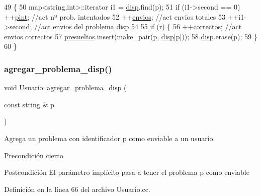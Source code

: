 \begin{DoxyCode}
49                                                  \{
50         map<string,int>::iterator i1 = \mbox{\hyperlink{class_usuario_a4402178ca5b057733c675e3849718e96}{disp}}.find(p);
51         \textcolor{keywordflow}{if} (i1->second == 0) ++\mbox{\hyperlink{class_usuario_adff16a149798e94b0747e7dc1bd85107}{pint}}; \textcolor{comment}{//act nº prob. intentados}
52         ++\mbox{\hyperlink{class_usuario_a485a741c0646e6414bd6cf669a77fc9c}{envios}}; \textcolor{comment}{//act envios totales}
53         ++i1->second; \textcolor{comment}{//act envios del problema disp}
54 
55         \textcolor{keywordflow}{if} (r) \{
56           ++\mbox{\hyperlink{class_usuario_a6d7fd52e0625b61d324922bf4783435e}{correctos}}; \textcolor{comment}{//act envios correctos}
57           \mbox{\hyperlink{class_usuario_ae614e565ce48a314a1e2b05beee8567b}{presueltos}}.insert(make\_pair(p, \mbox{\hyperlink{class_usuario_a4402178ca5b057733c675e3849718e96}{disp}}[p]));
58           \mbox{\hyperlink{class_usuario_a4402178ca5b057733c675e3849718e96}{disp}}.erase(p);
59         \}
60       \}
\end{DoxyCode}
\mbox{\label{class_usuario_a4dedcdcfe3d1769d6d2106d9fb2f7e51}} 
\subsubsection{\texorpdfstring{agregar\+\_\+problema\+\_\+disp()}{agregar\_problema\_disp()}}
{\footnotesize\ttfamily void Usuario\+::agregar\+\_\+problema\+\_\+disp (\begin{DoxyParamCaption}\item[{const string \&}]{p }\end{DoxyParamCaption})}



Agrega un problema con identificador p como enviable a un usuario. 

\begin{DoxyPrecond}{Precondición}
cierto 
\end{DoxyPrecond}
\begin{DoxyPostcond}{Postcondición}
El parámetro implícito pasa a tener el problema p como enviable 
\end{DoxyPostcond}


Definición en la línea 66 del archivo Usuario.\+cc.


